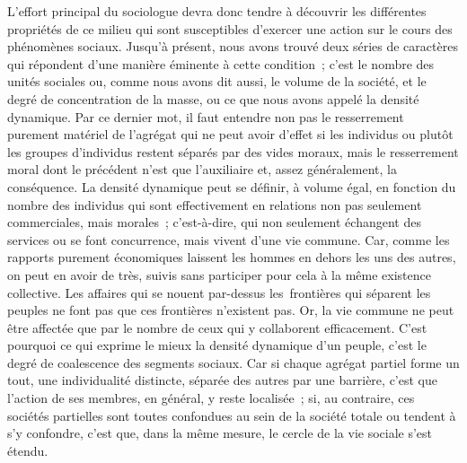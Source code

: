 \documentclass[french,twoside]{book} %
\begin{document}
L’effort principal du sociologue devra donc tendre à découvrir les différentes propriétés de ce milieu qui sont susceptibles d’exercer une action sur le cours des phénomènes sociaux. Jusqu’à présent, nous avons trouvé deux séries de caractères qui répondent d’une manière éminente à cette condition ; c’est le nombre des unités sociales ou, comme nous avons dit aussi, le volume de la société, et le degré de concentration de la masse, ou ce que nous avons appelé la densité dynamique. Par ce dernier mot, il faut entendre non pas le resserrement purement matériel de l’agrégat qui ne peut avoir d’effet si les individus ou plutôt les groupes d’individus restent séparés par des vides moraux, mais le resserrement moral dont le précédent n’est que l’auxiliaire et, assez généralement, la conséquence. La densité dynamique peut se définir, à volume égal, en fonction du nombre des individus qui sont effectivement en relations non pas seulement commerciales, mais morales ; c’est-à-dire, qui non seulement échangent des services ou se font concurrence, mais vivent d’une vie commune. Car, comme les rapports purement économiques laissent les hommes en dehors les uns des autres, on peut en avoir de très, suivis sans participer pour cela à la même existence collective. Les affaires qui se nouent par-dessus les frontières qui séparent les peuples ne font pas que ces frontières n’existent pas. Or, la vie commune ne peut être affectée que par le nombre de ceux qui y collaborent efficacement. C’est pourquoi ce qui exprime le mieux la densité dynamique d’un peuple, c’est le degré de coalescence des segments sociaux. Car si chaque agrégat partiel forme un tout, une individualité distincte, séparée des autres par une barrière, c’est que l’action de ses membres, en général, y reste localisée ; si, au contraire, ces sociétés partielles sont toutes confondues au sein de la société totale ou tendent à s’y confondre, c’est que, dans la même mesure, le cercle de la vie sociale s’est étendu.\par
\end{document}
